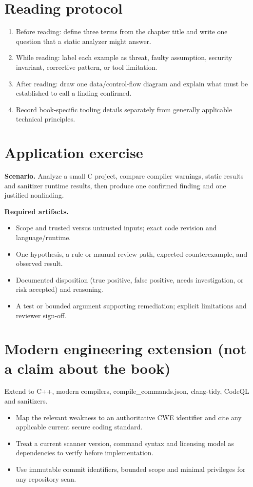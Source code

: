 \documentclass[10pt,letterpaper]{article}
\begin{document}
\section{Reading protocol}
\begin{enumerate}
\item Before reading: define three terms from the chapter title and write one question that a static analyzer might answer.
\item While reading: label each example as threat, faulty assumption, security invariant, corrective pattern, or tool limitation.
\item After reading: draw one data/control-flow diagram and explain what must be established to call a finding confirmed.
\item Record book-specific tooling details separately from generally applicable technical principles.
\end{enumerate}

\section{Application exercise}
\textbf{Scenario.} Analyze a small C project, compare compiler warnings, static results and sanitizer runtime results, then produce one confirmed finding and one justified nonfinding.

\textbf{Required artifacts.}\begin{itemize}
\item Scope and trusted versus untrusted inputs; exact code revision and language/runtime.
\item One hypothesis, a rule or manual review path, expected counterexample, and observed result.
\item Documented disposition (true positive, false positive, needs investigation, or risk accepted) and reasoning.
\item A test or bounded argument supporting remediation; explicit limitations and reviewer sign-off.
\end{itemize}

\section{Modern engineering extension (not a claim about the book)}
Extend to C++, modern compilers, compile\_commands.json, clang-tidy, CodeQL and sanitizers.

\begin{itemize}
\item Map the relevant weakness to an authoritative CWE identifier and cite any applicable current secure coding standard.
\item Treat a current scanner version, command syntax and licensing model as dependencies to verify before implementation.
\item Use immutable commit identifiers, bounded scope and minimal privileges for any repository scan.
\end{itemize}
\end{document}
